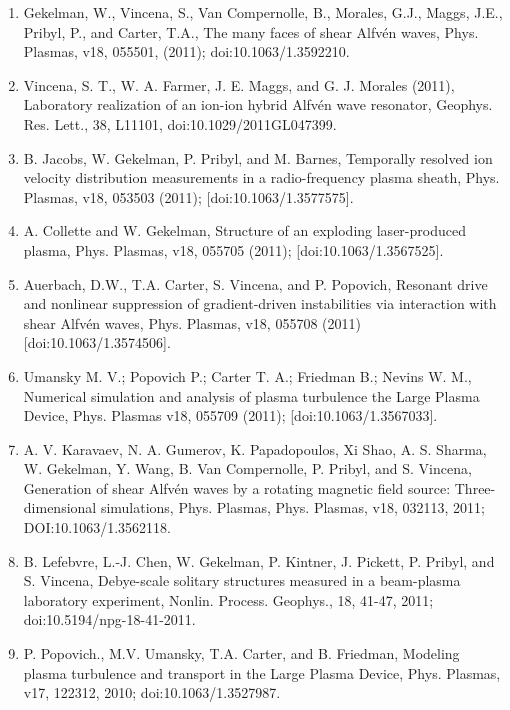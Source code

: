 \documentclass[11pt]{article}
\begin{document}
\begin{enumerate}
\item  Gekelman, W., Vincena, S., Van Compernolle, B., Morales, G.J., Maggs, J.E., Pribyl, P., and Carter, T.A., The many faces of shear Alfv\'{e}n waves, Phys. Plasmas, v18, 055501, (2011); doi:10.1063/1.3592210.

\item   Vincena, S. T., W. A. Farmer, J. E. Maggs, and G. J. Morales (2011), Laboratory realization of an ion-ion hybrid Alfv\'{e}n wave resonator, Geophys. Res. Lett., 38, L11101, doi:10.1029/2011GL047399.

\item  B. Jacobs, W. Gekelman, P. Pribyl, and M. Barnes, Temporally resolved ion velocity distribution measurements in a radio-frequency plasma sheath, Phys. Plasmas, v18, 053503 (2011); [doi:10.1063/1.3577575].

\item  A. Collette and W. Gekelman, Structure of an exploding laser-produced plasma, Phys. Plasmas, v18, 055705 (2011); [doi:10.1063/1.3567525].

\item   Auerbach, D.W., T.A. Carter, S. Vincena, and P. Popovich, Resonant drive and nonlinear suppression of gradient-driven instabilities via interaction with shear Alfv\'{e}n waves, Phys. Plasmas, v18, 055708 (2011) [doi:10.1063/1.3574506].

\item Umansky M. V.; Popovich P.; Carter T. A.; Friedman B.; Nevins W. M., Numerical simulation and analysis of plasma turbulence the Large Plasma Device, Phys. Plasmas v18, 055709 (2011); [doi:10.1063/1.3567033].

\item  A. V. Karavaev, N. A. Gumerov, K. Papadopoulos, Xi Shao, A. S. Sharma, W. Gekelman, Y. Wang, B. Van Compernolle, P. Pribyl, and S. Vincena, Generation of shear Alfv\'{e}n waves by a rotating magnetic field source: Three-dimensional simulations, Phys. Plasmas, Phys. Plasmas, v18, 032113, 2011; DOI:10.1063/1.3562118.

\item  B. Lefebvre, L.-J. Chen, W. Gekelman, P. Kintner, J. Pickett, P. Pribyl, and S. Vincena, Debye-scale solitary structures measured in a beam-plasma laboratory experiment, Nonlin. Process. Geophys., 18, 41-47, 2011; doi:10.5194/npg-18-41-2011.

\item   P. Popovich., M.V. Umansky, T.A. Carter, and B. Friedman, Modeling plasma turbulence and transport in the Large Plasma Device, Phys. Plasmas, v17, 122312, 2010; doi:10.1063/1.3527987.


\end{enumerate}
\end{document}
